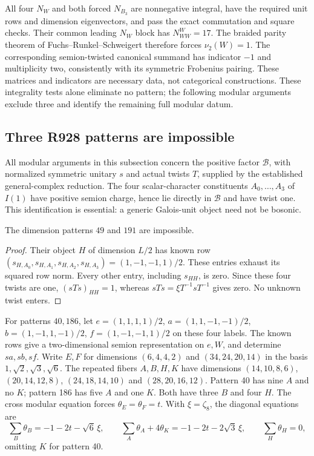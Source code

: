 All four $N_W$ and both forced $N_{B_3}$ are nonnegative integral,
have the required unit rows and dimension eigenvectors, and pass the
exact commutation and square checks. Their common leading $N_W$ block
has $N_{WW}^{W}=17$. The braided parity theorem of
Fuchs--Runkel--Schweigert \cite{FRSEven} therefore forces
$\nu_2(W)=1$. The corresponding semion-twisted canonical summand has
indicator $-1$ and multiplicity two, consistently with its symmetric
Frobenius pairing. These matrices and indicators are necessary data,
not categorical constructions. These integrality tests alone eliminate no pattern; the following modular arguments exclude three and identify the remaining full modular datum.


\subsection{Three R928 patterns are impossible}
\label{sec:r928-three-patterns}
All modular arguments in this subsection concern the positive factor
$\mathcal B$, with normalized symmetric unitary $s$ and actual twists
$T$, supplied by the established general-complex reduction.
The four scalar-character constituents $A_0,\ldots,A_3$ of $I(1)$
have positive semion charge, hence lie directly in $\mathcal B$ and
have twist one. This identification is essential: a generic
Galois-unit object need not be bosonic.

\begin{proposition}
The dimension patterns $49$ and $191$ are impossible.
\end{proposition}
\begin{proof}
Their object $H$ of dimension $L/2$ has known row
$(s_{H,A_0},s_{H,A_1},s_{H,A_2},s_{H,A_3})=(1,-1,-1,1)/2$.
These entries exhaust its squared row norm. Every other entry,
including $s_{HH}$, is zero. Since these four twists are one,
$(sTs)_{HH}=1$, whereas
$sTs=\xi T^{-1}sT^{-1}$ gives zero. No unknown twist enters.
\end{proof}

For patterns $40,186$, let
$e=(1,1,1,1)/2$, $a=(1,1,-1,-1)/2$,
$b=(1,-1,1,-1)/2$, $f=(1,-1,-1,1)/2$ on these four labels.
The known rows give a two-dimensional semion representation on
$e,W$, and determine $sa,sb,sf$. Write $E,F$ for dimensions
$(6,4,4,2)$ and $(34,24,20,14)$ in the basis
$1,\sqrt2,\sqrt3,\sqrt6$.
The repeated fibers $A,B,H,K$ have dimensions
$(14,10,8,6)$, $(20,14,12,8)$, $(24,18,14,10)$ and $(28,20,16,12)$.
Pattern 40 has nine $A$ and no $K$; pattern 186 has five $A$ and one $K$.
Both have three $B$ and four $H$.
The cross modular equation forces $\theta_E=\theta_F=t$. With
$\xi=\zeta_8$, the diagonal equations are
\[
\sum_B\theta_B=-1-2t-\sqrt6\,\xi,\qquad
\sum_A\theta_A+4\theta_K=-1-2t-2\sqrt3\,\xi,\qquad
\sum_H\theta_H=0,
\]
omitting $K$ for pattern 40.


